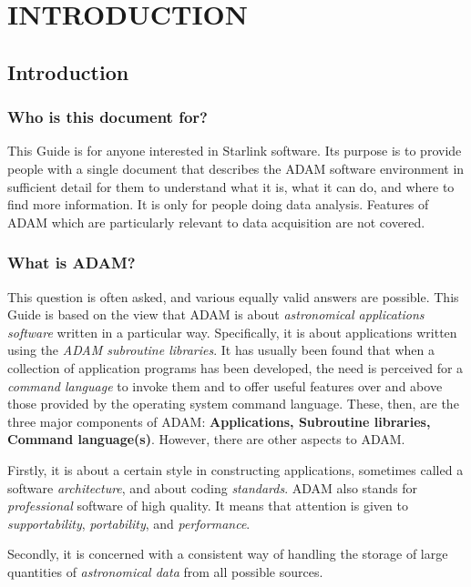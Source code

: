 \part{INTRODUCTION}

\chapter{Introduction}
\label{C_intro}

\section{Who is this document for?}
\label{S_who}

This Guide is for anyone interested in Starlink software.
Its purpose is to provide people with a single document that describes the
ADAM software environment in sufficient detail for them to understand what it
is, what it can do, and where to find more information.
It is only for people doing data analysis.
Features of ADAM which are particularly relevant to data acquisition are not
covered.

\section{What is ADAM?}
\label{S_what}

This question is often asked, and various equally valid answers are possible.
This Guide is based on the view that ADAM is about {\em astronomical
applications software} written in a particular way.
Specifically, it is about applications written using the {\em ADAM subroutine
libraries}.
It has usually been found that when a collection of application programs has
been developed, the need is perceived for a {\em command language} to invoke
them and to offer useful features over and above those provided by the
operating system command language.
These, then, are the three major components of ADAM: {\bf Applications,
Subroutine libraries, Command language(s)}\@.
However, there are other aspects to ADAM.

Firstly, it is about a certain style in constructing applications, sometimes
called a software {\em architecture}, and about coding {\em standards}.
ADAM also stands for {\em professional} software of high quality.
It means that attention is given to {\em supportability}, {\em
portability}, and {\em performance}.

Secondly, it is concerned with a consistent way of handling the storage of
large quantities of {\em astronomical data} from all possible sources.

